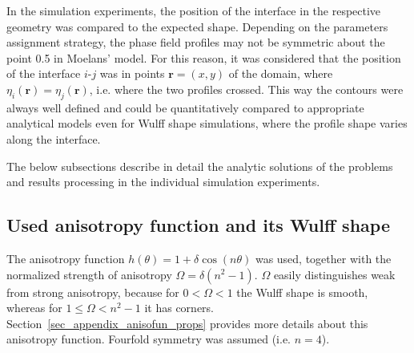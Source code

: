 In the simulation experiments, the position of the interface in the respective geometry was compared to the expected shape. Depending on the parameters assignment strategy, the phase field profiles may not be symmetric about the point 0.5 in Moelans' model. For this reason, it was considered that the position of the interface $i$-$j$ was in points $\bm{r}=(x,y)$ of the domain, where $\eta_i(\bm{r})=\eta_j(\bm{r})$, i.e. where the two profiles crossed. This way the contours were always well defined and could be quantitatively compared to appropriate analytical models even for Wulff shape simulations, where the profile shape varies along the interface.

The below subsections describe in detail the analytic solutions of the problems and results processing in the individual simulation experiments. 

\subsection{Used anisotropy function and its Wulff shape}
The anisotropy function $h(\theta)=1+\delta\cos(n\theta)$ was used, together with the normalized strength of anisotropy $\Omega=\delta(n^2-1)$. $\Omega$ easily distinguishes weak from strong anisotropy, because for $0<\Omega<1$ the Wulff shape is smooth, whereas for $1\leq\Omega<n^2-1$ it has corners. Section~\ref{sec_appendix_anisofun_props} provides more details about this anisotropy function. Fourfold symmetry was assumed (i.e. $n=4$).

